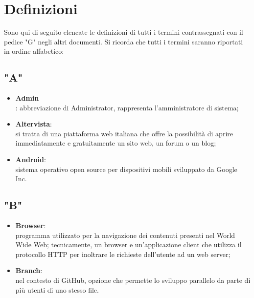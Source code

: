 \section{Definizioni}
Sono qui di seguito elencate le definizioni di tutti i termini contrassegnati con il pedice "G" negli altri documenti.
Si ricorda che tutti i termini saranno riportati in ordine alfabetico:

\subsection{"A"}
\begin{itemize}
\item \textbf{Admin}\\: abbreviazione di Administrator, rappresenta l'amministratore di sistema;
\item \textbf{Altervista}:\\ si tratta di una piattaforma web italiana che offre la possibilità di aprire immediatamente e gratuitamente un sito web, un forum o un blog;
\item \textbf{Android}:\\ sistema operativo open source per dispositivi mobili sviluppato da Google Inc.
\end{itemize}
\subsection{"B"}
\begin{itemize}
\item \textbf{Browser}:\\ programma utilizzato per la navigazione dei contenuti presenti nel World Wide Web;
tecnicamente, un browser e un’applicazione client che utilizza il protocollo HTTP per inoltrare le richieste dell’utente ad un web server;
\item \textbf{Branch}:\\ nel contesto di GitHub, opzione che permette lo sviluppo parallelo da parte di più utenti di uno stesso file.
\end{itemize}
